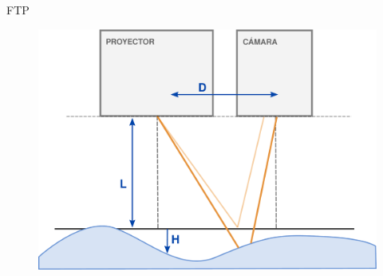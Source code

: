 \documentclass[aspectratio=169]{beamer}
\begin{document}
\begin{frame}{FTP}
	\begin{minipage}{0.7\textwidth}
	  \begin{figure}
		\includegraphics[width=1\textwidth]{figs/ftp_experimental.pdf}
	  \end{figure}
	\end{minipage} \hfill
	\begin{minipage}{0.29\textwidth}
	  \begin{figure}

\end{figure}
\end{minipage}
\end{frame}
\end{document}
